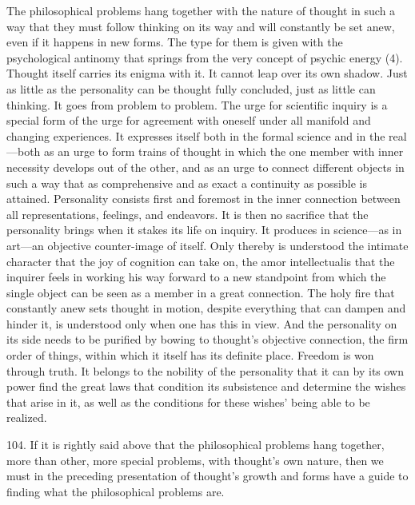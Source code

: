 \documentclass[12pt,a4paper]{book}
\newcommand{\opage}[1]{\marginnote{\footnotesize\textit{[#1]}}}
\begin{document}
The philosophical problems hang together with the nature of thought in such a
way that they must follow thinking on its way and will constantly be set
anew, even if it happens in new forms. The type for them is given with the
psychological antinomy that springs from the very concept of psychic energy
(4). Thought itself carries its enigma with it. It cannot leap over its own
shadow. Just as little as the personality can be thought fully concluded,
just as little can thinking. It goes from problem to problem. The urge for
scientific inquiry is a special form of the urge for agreement with oneself
under all manifold and changing experiences. It expresses itself both in the
formal science and in the real---both as an urge to form trains of thought in
which the one member with inner necessity develops out of the other, and as
an urge to connect different objects in such a way that as comprehensive and
as exact a continuity as possible is attained. Personality consists first and
foremost in the inner connection between all representations, feelings, and
endeavors. It is then no sacrifice that the personality brings when it stakes
its life on inquiry. It produces in science---as in art---an objective
counter-image of itself. Only thereby is understood the intimate character
that the joy of cognition can take on, the amor intellectualis that the
inquirer feels in working his way forward to a new standpoint from which the
single object can be seen as a member in a great \opage{248}connection. The holy fire
that constantly anew sets thought in motion, despite everything that can
dampen and hinder it, is understood only when one has this in view. And the
personality on its side needs to be purified by bowing to thought's objective
connection, the firm order of things, within which it itself has its definite
place. Freedom is won through truth. It belongs to the nobility of the
personality that it can by its own power find the great laws that condition
its subsistence and determine the wishes that arise in it, as well as the
conditions for these wishes' being able to be realized.

104. If it is rightly said above that the philosophical problems hang
together, more than other, more special problems, with thought's own nature,
then we must in the preceding presentation of thought's growth and forms have
a guide to finding what the philosophical problems are.
\end{document}
